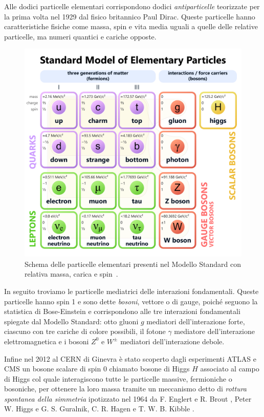     Alle dodici particelle elementari corrispondono dodici \textit{antiparticelle} teorizzate per la prima volta nel 1929 dal fisico britannico Paul Dirac. Queste particelle hanno caratteristiche fisiche come massa, spin e vita media uguali a quelle delle relative particelle, ma numeri quantici e cariche opposte.

    \begin{figure}[t]
        \centering
        \includegraphics[width=0.8\linewidth]{res/fig/1-chapter/1-Standard_Model_of_Elementary_Particles.pdf}
        \caption{Schema delle particelle elementari presenti nel Modello Standard con relativa massa, carica e spin~\cite{Wikimedia_Standard_Model}.}
        \label{fig:1-standard-model}
    \end{figure}

    In seguito troviamo le particelle mediatrici delle interazioni fondamentali. Queste particelle hanno spin 1 e sono dette \textit{bosoni}, vettore o di gauge, poiché seguono la statistica di Bose-Einstein e corrispondono alle tre interazioni fondamentali spiegate dal Modello Standard: otto gluoni $g$ mediatori dell'interazione forte, ciascuno con tre cariche di colore possibili, il fotone $\gamma$ mediatore dell'interazione elettromagnetica e i bosoni $Z^0$ e $W^\pm$ mediatori dell'interazione debole.

    Infine nel 2012 al CERN di Ginevra è stato scoperto dagli esperimenti ATLAS \cite{ATLAS_2012} e CMS \cite{CMS_2012} un bosone scalare di spin 0 chiamato bosone di Higgs $H$ associato al campo di Higgs col quale interagiscono tutte le particelle massive, fermioniche o bosoniche, per ottenere la loro massa tramite un meccanismo detto di \textit{rottura spontanea della simmetria} ipotizzato nel 1964 da F. Englert e R. Brout \cite{Englert_1964}, Peter W. Higgs \cite{Higgs_1964} e G. S. Guralnik, C. R. Hagen e T. W. B. Kibble \cite{GHK_1964}.
    
